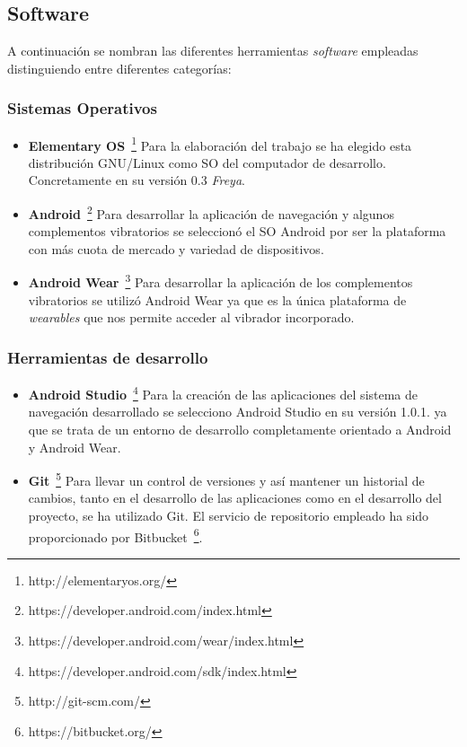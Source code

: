 \subsection{Software}
\label{sec:herramientasSoftware}

A continuación se nombran las diferentes herramientas \emph{software} empleadas distinguiendo entre
diferentes categorías:

\subsubsection{Sistemas Operativos}

\begin{itemize}
  \item \textbf{Elementary OS}~\footnote{http://elementaryos.org/} Para la elaboración del trabajo
    se ha elegido esta distribución GNU/Linux como \acs{SO} del computador de
    desarrollo. Concretamente en su versión 0.3 \emph{Freya}.

  \item \textbf{Android}~\footnote{https://developer.android.com/index.html} Para desarrollar
    la aplicación de navegación y algunos complementos vibratorios se seleccionó el \acs{SO}
    Android por ser la plataforma con más cuota de mercado y variedad de dispositivos.

  \item \textbf{Android Wear}~\footnote{https://developer.android.com/wear/index.html} Para
    desarrollar la aplicación de los complementos vibratorios se utilizó Android Wear ya que es la
    única plataforma de \emph{wearables} que nos permite acceder al vibrador incorporado.

\end{itemize}

\subsubsection{Herramientas de desarrollo}

\begin{itemize}
  \item \textbf{Android Studio}~\footnote{https://developer.android.com/sdk/index.html} Para la
    creación de las aplicaciones del sistema de navegación desarrollado se selecciono Android Studio
    en su versión 1.0.1. ya que se trata de un entorno de desarrollo completamente orientado a
    Android y Android Wear.

  \item \textbf{Git}~\footnote{http://git-scm.com/} Para llevar un control de versiones y así
    mantener un historial de cambios, tanto en el desarrollo de las aplicaciones como en el
    desarrollo del proyecto, se ha utilizado Git. El servicio de repositorio empleado ha sido
    proporcionado por Bitbucket~\footnote{https://bitbucket.org/}.

\end{itemize}

